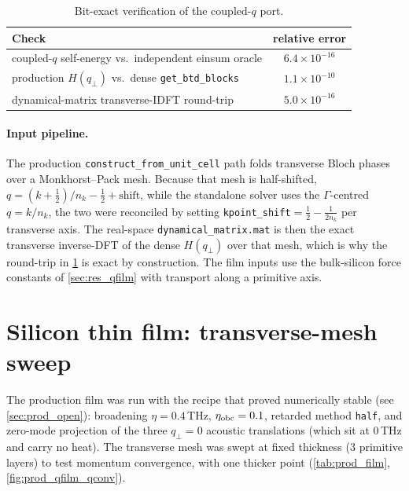\begin{table}[ht]
\centering
\caption{Bit-exact verification of the coupled-$q$ port.}
\label{tab:prod_validation}
\begin{tabular}{lc}
\hline
Check & relative error \\
\hline
coupled-$q$ self-energy vs.\ independent einsum oracle & $6.4\times10^{-16}$ \\
production $H(q_\perp)$ vs.\ dense \texttt{get\_btd\_blocks} & $1.1\times10^{-10}$ \\
dynamical-matrix transverse-IDFT round-trip & $5.0\times10^{-16}$ \\
\hline
\end{tabular}
\end{table}

\paragraph{Input pipeline.} The production \texttt{construct\_from\_unit\_cell}
path folds transverse Bloch phases over a Monkhorst--Pack mesh. Because
that mesh is half-shifted, $q=(k+\tfrac12)/n_k-\tfrac12+\text{shift}$,
while the standalone solver uses the $\Gamma$-centred $q=k/n_k$, the two
were reconciled by setting \texttt{kpoint\_shift}$=\tfrac12-\tfrac{1}{2n_k}$
per transverse axis. The real-space \texttt{dynamical\_matrix.mat} is then
the exact transverse inverse-DFT of the dense $H(q_\perp)$ over that mesh,
which is why the round-trip in \cref{tab:prod_validation} is exact by
construction. The film inputs use the bulk-silicon force constants of
\cref{sec:res_qfilm} with transport along a primitive axis.

\section{Silicon thin film: transverse-mesh sweep}
\label{sec:prod_film}

The production film was run with the recipe that proved numerically
stable (see \cref{sec:prod_open}): broadening $\eta=0.4$\,THz, $\eta_{\rm
obc}=0.1$, retarded method \texttt{half}, and zero-mode projection of the
three $q_\perp{=}0$ acoustic translations (which sit at $0$\,THz and carry
no heat). The transverse mesh was swept at fixed thickness ($3$ primitive
layers) to test momentum convergence, with one thicker point
(\cref{tab:prod_film}, \cref{fig:prod_qfilm_qconv}).


